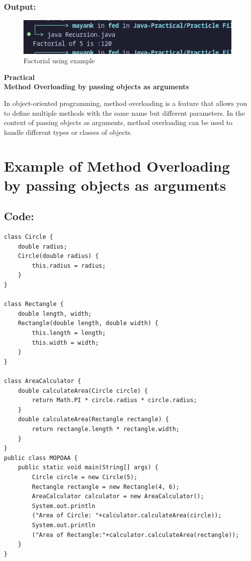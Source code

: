 \documentclass[a4paper,12pt]{article}
\newcounter{practicalno} %
\newcommand{\practicaltitle}[1]{
    \stepcounter{practicalno} %
    \newpage
    \begin{center}
        \vspace{1cm}
        \Large\textbf{Practical \thepracticalno} \\
        \vspace{0.5cm}
        \Large\textbf{#1} %
        \normalsize\vspace{1cm}
    \end{center}
}
\begin{document}
\subsubsection{Output: }
\begin{figure}[H]
    \centering
    \includegraphics[width=0.9\linewidth]{images/RecursionOut.png}
    \caption{Factorial using example}
    \label{fig:sample_image}
\end{figure}

\setcounter{section}{0}

\practicaltitle{Method Overloading by passing objects as arguments}
In object-oriented programming, method overloading is a feature that allows you to define multiple methods with the same name but different parameters. In the context of passing objects as arguments, method overloading can be used to handle different types or classes of objects.

\section{Example of Method Overloading by passing objects as arguments}
\subsection{Code: }
\begin{lstlisting}
class Circle {
    double radius;
    Circle(double radius) {
        this.radius = radius;
    }
}

class Rectangle {
    double length, width;
    Rectangle(double length, double width) {
        this.length = length;
        this.width = width;
    }
}

class AreaCalculator {
    double calculateArea(Circle circle) {
        return Math.PI * circle.radius * circle.radius;
    }
    double calculateArea(Rectangle rectangle) {
        return rectangle.length * rectangle.width;
    }
}
public class MOPOAA {
    public static void main(String[] args) {
        Circle circle = new Circle(5);
        Rectangle rectangle = new Rectangle(4, 6);
        AreaCalculator calculator = new AreaCalculator();
        System.out.println
        ("Area of Circle: "+calculator.calculateArea(circle));
        System.out.println
        ("Area of Rectangle:"+calculator.calculateArea(rectangle));
    }
}    
\end{lstlisting}
\end{document}
